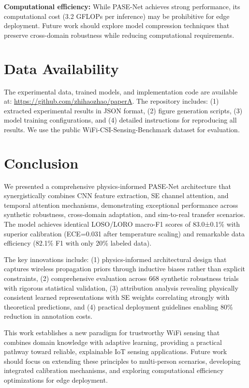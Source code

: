 \documentclass[lettersize,journal]{IEEEtran}
\begin{document}
\textbf{Computational efficiency:} While PASE-Net achieves strong performance, its computational cost (3.2 GFLOPs per inference) may be prohibitive for edge deployment. Future work should explore model compression techniques that preserve cross-domain robustness while reducing computational requirements.

\section{Data Availability}

The experimental data, trained models, and implementation code are available at: \url{https://github.com/zhihaozhao/paperA}. The repository includes: (1) extracted experimental results in JSON format, (2) figure generation scripts, (3) model training configurations, and (4) detailed instructions for reproducing all results. We use the public WiFi-CSI-Sensing-Benchmark dataset for evaluation.

\section{Conclusion}

We presented a comprehensive physics-informed PASE-Net architecture that synergistically combines CNN feature extraction, SE channel attention, and temporal attention mechanisms, demonstrating exceptional performance across synthetic robustness, cross-domain adaptation, and sim-to-real transfer scenarios. The model achieves identical LOSO/LORO macro-F1 scores of 83.0±0.1\% with superior calibration (ECE=0.031 after temperature scaling) and remarkable data efficiency (82.1\% F1 with only 20\% labeled data).

The key innovations include: (1) physics-informed architectural design that captures wireless propagation priors through inductive biases rather than explicit constraints, (2) comprehensive evaluation across 668 synthetic robustness trials with rigorous statistical validation, (3) attribution analysis revealing physically consistent learned representations with SE weights correlating strongly with theoretical predictions, and (4) practical deployment guidelines enabling 80\% reduction in annotation costs.

This work establishes a new paradigm for trustworthy WiFi sensing that combines domain knowledge with adaptive learning, providing a practical pathway toward reliable, explainable IoT sensing applications. Future work should focus on extending these principles to multi-person scenarios, developing integrated calibration mechanisms, and exploring computational efficiency optimizations for edge deployment.
\end{document}
